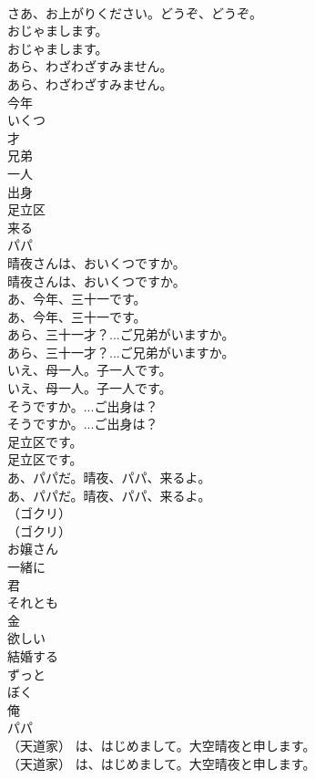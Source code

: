 \documentclass[8pt]{extreport}
\begin{document}
\begin{CJK}{UTF8}{min}
\\	さあ、お上がりください。どうぞ、どうぞ。 
\\	おじゃまします。	
\\	おじゃまします。 
\\	あら、わざわざすみません。	
\\	あら、わざわざすみません。 
\\	今年
\\	いくつ
\\	才
\\	兄弟
\\	一人
\\	出身
\\	足立区
\\	来る
\\	パパ
\\	晴夜さんは、おいくつですか。	
\\	晴夜さんは、おいくつですか。 
\\	あ、今年、三十一です。	
\\	あ、今年、三十一です。 
\\	あら、三十一才？...ご兄弟がいますか。	
\\	あら、三十一才？...ご兄弟がいますか。 
\\	いえ、母一人。子一人です。	
\\	いえ、母一人。子一人です。 
\\	そうですか。...ご出身は？	
\\	そうですか。...ご出身は？ 
\\	足立区です。	
\\	足立区です。 
\\	あ、パパだ。晴夜、パパ、来るよ。	
\\	あ、パパだ。晴夜、パパ、来るよ。 
\\	（ゴクリ）	
\\	（ゴクリ） 
\\	お嬢さん
\\	一緒に
\\	君
\\	それとも
\\	金
\\	欲しい
\\	結婚する
\\	ずっと
\\	ぼく
\\	俺
\\	パパ
\\	（天道家） は、はじめまして。大空晴夜と申します。	
\\	（天道家） は、はじめまして。大空晴夜と申します。 

\end{CJK}
\end{document}
